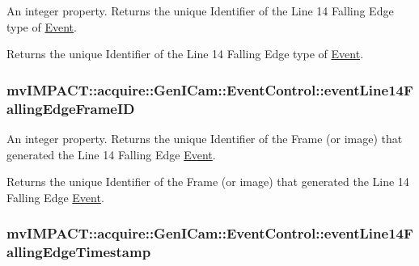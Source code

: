 An integer property. Returns the unique Identifier of the Line 14 Falling Edge type of \hyperlink{classmv_i_m_p_a_c_t_1_1acquire_1_1_event}{Event}. 

Returns the unique Identifier of the Line 14 Falling Edge type of \hyperlink{classmv_i_m_p_a_c_t_1_1acquire_1_1_event}{Event}. \hypertarget{classmv_i_m_p_a_c_t_1_1acquire_1_1_gen_i_cam_1_1_event_control_a9f6b5f77eed8f7ae5f55061d37da5b92}{
\subsubsection[{event\+Line14\+Falling\+Edge\+Frame\+I\+D}]{ mv\+I\+M\+P\+A\+C\+T\+::acquire\+::\+Gen\+I\+Cam\+::\+Event\+Control\+::event\+Line14\+Falling\+Edge\+Frame\+I\+D}}\label{classmv_i_m_p_a_c_t_1_1acquire_1_1_gen_i_cam_1_1_event_control_a9f6b5f77eed8f7ae5f55061d37da5b92}


An integer property. Returns the unique Identifier of the Frame (or image) that generated the Line 14 Falling Edge \hyperlink{classmv_i_m_p_a_c_t_1_1acquire_1_1_event}{Event}. 

Returns the unique Identifier of the Frame (or image) that generated the Line 14 Falling Edge \hyperlink{classmv_i_m_p_a_c_t_1_1acquire_1_1_event}{Event}. \hypertarget{classmv_i_m_p_a_c_t_1_1acquire_1_1_gen_i_cam_1_1_event_control_a6aad5cf0920f370f4077de311a844127}{
\subsubsection[{event\+Line14\+Falling\+Edge\+Timestamp}]{ mv\+I\+M\+P\+A\+C\+T\+::acquire\+::\+Gen\+I\+Cam\+::\+Event\+Control\+::event\+Line14\+Falling\+Edge\+Timestamp}}\label{classmv_i_m_p_a_c_t_1_1acquire_1_1_gen_i_cam_1_1_event_control_a6aad5cf0920f370f4077de311a844127}


